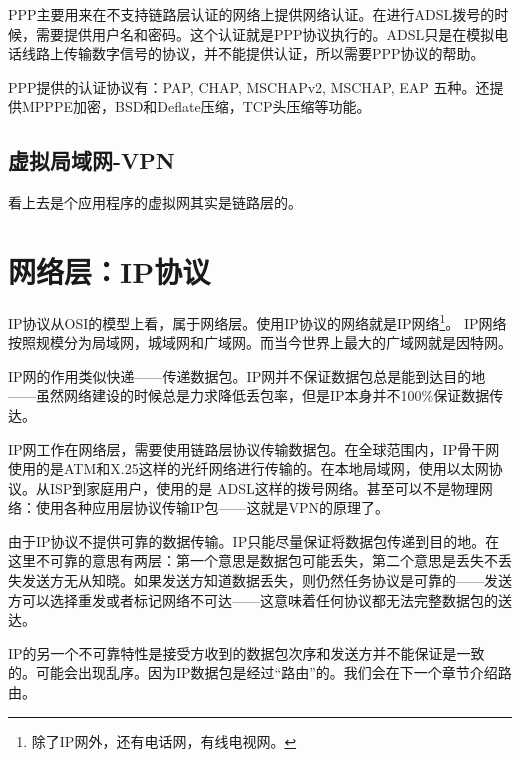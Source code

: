 
PPP主要用来在不支持链路层认证的网络上提供网络认证。在进行ADSL拨号的时候，需要提供用户名和密码。这个认证就是PPP协议执行的。ADSL只是在模拟电话线路上传输数字信号的协议，并不能提供认证，所以需要PPP协议的帮助。

PPP提供的认证协议有：PAP, CHAP, MSCHAPv2, MSCHAP, EAP 五种。还提供MPPPE加密，BSD和Deflate压缩，TCP头压缩等功能。



\subsection{虚拟局域网-VPN}

看上去是个应用程序的虚拟网其实是链路层的。

\section{网络层：IP协议}

IP协议从OSI的模型上看，属于网络层。使用IP协议的网络就是IP网络\footnote{除了IP网外，还有电话网，有线电视网。}。
IP网络按照规模分为局域网，城域网和广域网。而当今世界上最大的广域网就是因特网。

IP网的作用类似快递——传递数据包。IP网并不保证数据包总是能到达目的地——虽然网络建设的时候总是力求降低丢包率，但是IP本身并不100\%保证数据传达。

IP网工作在网络层，需要使用链路层协议传输数据包。在全球范围内，IP骨干网使用的是ATM和X.25这样的光纤网络进行传输的。在本地局域网，使用以太网协议。从ISP到家庭用户，使用的是
ADSL这样的拨号网络。甚至可以不是物理网络：使用各种应用层协议传输IP包——这就是VPN的原理了。

由于IP协议不提供可靠的数据传输。IP只能尽量保证将数据包传递到目的地。在这里不可靠的意思有两层：第一个意思是数据包可能丢失，第二个意思是丢失不丢失发送方无从知晓。如果发送方知道数据丢失，则仍然任务协议是可靠的——发送方可以选择重发或者标记网络不可达——这意味着任何协议都无法完整数据包的送达。

IP的另一个不可靠特性是接受方收到的数据包次序和发送方并不能保证是一致的。可能会出现乱序。因为IP数据包是经过“路由”的。我们会在下一个章节介绍路由。

